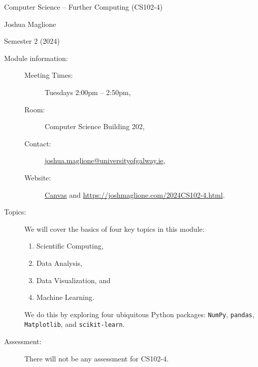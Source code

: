 \documentclass[a4paper, 12pt]{article}
\begin{document}
\pagestyle{empty}

\begin{center}
{\Large Computer Science -- Further Computing (CS102-4)} 

\vspace{0.25cm}

{\large Joshua Maglione}

\vspace{0.25cm}

Semester 2 (2024)
\end{center}

\vspace{0.5cm}

\begin{description}
    \item[Module information:] \hfill
    \begin{description}
      \item[Meeting Times:] Tuesdays 2:00pm -- 2:50pm,
      \item[Room:] Computer Science Building 202,
      \item[Contact:] \url{joshua.maglione@universityofgalway.ie},
      \item[Website:] \href{https://universityofgalway.instructure.com/}{\textsf{Canvas}} and \url{https://joshmaglione.com/2024CS102-4.html}.
    \end{description} 
    \vspace{1cm}
    \item[Topics:] We will cover the basics of four key topics in this module:
    \begin{enumerate} 
      \item Scientific Computing,
      \item Data Analysis,
      \item Data Visualization, and
      \item Machine Learning.
    \end{enumerate} 
    We do this by exploring four ubiquitous Python packages: \texttt{NumPy},
    \texttt{pandas}, \texttt{Matplotlib}, and \texttt{scikit-learn}.
    \vspace{1cm}
    \item[Assessment:] There will not be any assessment for CS102-4.
\end{description}
\end{document}

